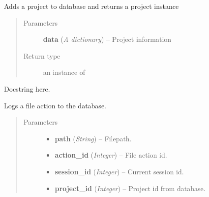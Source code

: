 \documentclass[letterpaper,10pt,english]{sphinxmanual}
\begin{document}

\begin{fulllineitems}
\label{controller:controller.project.add_project}
Adds a project to database and returns a  project instance
\begin{quote}\begin{description}
\item[{Parameters}] \leavevmode
\textbf{data} (\emph{A dictionary}) -- Project information

\item[{Return type}] \leavevmode
an instance of {\hyperref[models:models.Project]{}}

\end{description}\end{quote}

\end{fulllineitems}


\begin{fulllineitems}
\label{controller:controller.project.check_password}
Docstring here.

\end{fulllineitems}


\begin{fulllineitems}
\label{controller:controller.project.create_file_action}
Logs a file action to the database.
\begin{quote}\begin{description}
\item[{Parameters}] \leavevmode\begin{itemize}
\item {} 
\textbf{path} (\emph{String}) -- Filepath.

\item {} 
\textbf{action\_id} (\emph{Integer}) -- File action id.

\item {} 
\textbf{session\_id} (\emph{Integer}) -- Current session id.

\item {} 
\textbf{project\_id} (\emph{Integer}) -- Project id from database.

\end{itemize}

\end{description}\end{quote}

\end{fulllineitems}
\end{document}
